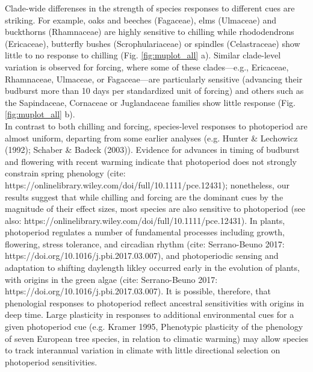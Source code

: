 \documentclass{article}\usepackage[]{graphicx}\usepackage[]{color}
\begin{document}
Clade-wide differenses in the strength of species responses to different cues are striking. For example, oaks and beeches (Fagaceae), elms (Ulmaceae) and buckthorns (Rhamnaceae) are highly sensitive to chilling while rhododendrons (Ericaceae), butterfly bushes (Scrophulariaceae) or spindles (Celastraceae) show little to no response to chilling (Fig. \ref{fig:muplot_all} a). %
Similar clade-level variation is observed for forcing, where some of these clades---e.g., Ericaceae, Rhamnaceae, Ulmaceae, or Fagaceae---are particularly sensitive (advancing their budburst more than 10 days per standardized unit of forcing) and others such as the Sapindaceae, Cornaceae or Juglandaceae families show little response (Fig. \ref{fig:muplot_all} b).\\ %
In contrast to both chilling and forcing, species-level responses to photoperiod are almost uniform, departing from some earlier analyses (e.g. Hunter & Lechowicz (1992); Schaber & Badeck (2003)). Evidence for advances in timing of budburst and flowering with recent warming indicate that photoperiod does not strongly constrain spring phenology (cite: https://onlinelibrary.wiley.com/doi/full/10.1111/pce.12431); nonetheless, our results suggest that while chilling and forcing are the dominant cues by the magnitude of their effect sizes, most species are also sensitive to photoperiod (see also: https://onlinelibrary.wiley.com/doi/full/10.1111/pce.12431). In plants, photoperiod regulates a number of fundamental processes including growth, flowering, stress tolerance, and circadian rhythm (cite: Serrano-Beuno 2017:  https://doi.org/10.1016/j.pbi.2017.03.007), and photoperiodic sensing and adaptation to shifting daylength likley occurred early in the evolution of plants, with origins in the green algae (cite: Serrano-Beuno 2017:  https://doi.org/10.1016/j.pbi.2017.03.007). It is possible, therefore, that phenologial responses to photoperiod reflect ancestral sensitivities with origins in deep time. Large plasticity in responses to additional environmental cues for a given photoperiod cue (e.g. Kramer 1995, Phenotypic plasticity of the phenology of seven European tree species, in relation to climatic warming) may allow species to track interannual variation in climate with little directional selection on photoperiod sensitivities.\\
\end{document}
